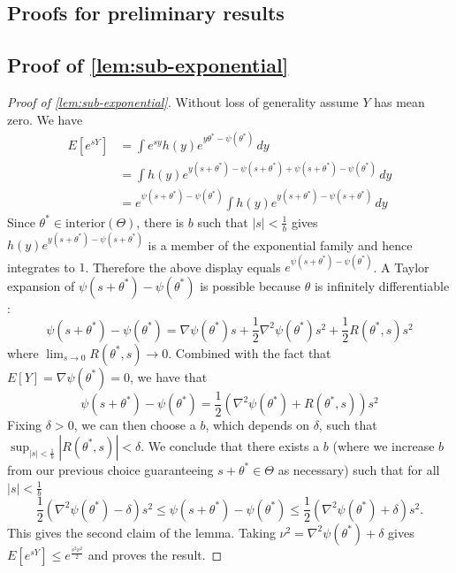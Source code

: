 \documentclass[ejs,noshowframe]{imsart}
\theoremstyle{plain}
\theoremstyle{definition}
\begin{document}
\begin{appendix}


\section{Proofs for preliminary results}
\label{sec:app-preliminary}
\subsection{Proof of \autoref{lem:sub-exponential}}
\begin{proof}[Proof of \autoref{lem:sub-exponential}]
Without loss of generality assume $Y$ has mean zero. We have
\begin{align*}
E[e^{s Y}] &= \int e^{s y} h(y) e^{y \theta^{*} - \psi(\theta^{*})} \, dy\\
&= \int h(y) e^{y (s + \theta^{*}) - \psi(s + \theta^{*}) + \psi(s + 
\theta^{*}) - \psi(\theta^{*})} \, dy\\
&= e^{\psi(s + \theta^{*}) - \psi(\theta^{*})} \int h(y) e^{y(s + \theta^{*}) - 
\psi(s + \theta^{*})} \, dy
\end{align*}
Since $\theta^{*} \in \mathrm{interior}(\Theta)$, there is $b$ such that $|s| < 
\frac{1}{b}$ gives $h(y) e^{y(s + \theta^{*}) - \psi(s + \theta^{*})}$ is a 
member of the exponential family and hence integrates to $1$. Therefore the 
above display equals $e^{\psi(s + \theta^{*}) - \psi(\theta^{*})}$.
A Taylor expansion of $\psi(s + \theta^{*}) - \psi(\theta^{*})$ is possible 
because $\theta$ is infinitely differentiable \citep{Brown1986}:
  $$\psi(s + \theta^{*}) - \psi(\theta^{*}) = \nabla \psi(\theta^{*}) s + 
\frac{1}{2} \nabla^{2} \psi(\theta^{*}) s^2 + \frac{1}{2} R(\theta^{*}, s) s^2$$
  where $\lim_{s \to 0} R(\theta^{*}, s) \to 0$.
  Combined with the fact that $E[Y] = \nabla \psi(\theta^{*}) = 0$, we have that
  $$\psi(s + \theta^{*}) - \psi(\theta^{*}) = \frac{1}{2} \left(\nabla^{2} 
\psi(\theta^{*}) +  R(\theta^{*}, s)\right) s^2$$
Fixing $\delta>0$, we can then choose a $b$, which depends on $\delta$, such 
that\\ $\sup_{|s| < \frac{1}{b}} \left| R(\theta^{*}, s) \right| < \delta$. We 
conclude that there exists a $b$ (where we increase $b$ from our previous 
choice guaranteeing $s + \theta^{*} \in \Theta$ as necessary) such that for all 
$|s| < \frac{1}{b}$
  $$\frac{1}{2} \left(\nabla^{2} \psi(\theta^{*}) - \delta\right) s^{2} \leq 
\psi(s + \theta^{*}) - \psi(\theta^{*}) \leq \frac{1}{2} \left(\nabla^{2} 
\psi(\theta^{*}) + \delta\right) s^{2}.$$
  This gives the second claim of the lemma. Taking $\nu^{2} = \nabla^{2} 
\psi(\theta^{*}) + \delta$ gives
$E[e^{s Y}] \leq e^{\frac{s^{2} \nu^{2}}{2}}$ and proves the result.
\end{proof}

\end{appendix}
\end{document}

